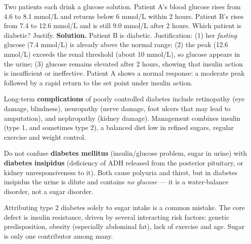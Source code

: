 \documentclass[11pt]{article}
\newcommand{\cle}[1]{{\popxbold\color{popdark}#1}}
\begin{document}
\begin{exoresolu}
Two patients each drink a glucose solution. Patient A's blood glucose rises from 4.6 to 8.1 mmol/L and returns below 6 mmol/L within 2 hours. Patient B's rises from 7.4 to 12.6 mmol/L and is still 9.0 mmol/L after 2 hours. Which patient is diabetic? Justify.
\tcblower
\textbf{Solution.} Patient B is diabetic. Justification: (1) her \emph{fasting} glucose (7.4 mmol/L) is already above the normal range; (2) the peak (12.6 mmol/L) exceeds the renal threshold (about 10 mmol/L), so glucose appears in the urine; (3) glucose remains elevated after 2 hours, showing that insulin action is insufficient or ineffective. Patient A shows a normal response: a moderate peak followed by a rapid return to the set point under insulin action.
\end{exoresolu}

Long-term \textbf{complications} of poorly controlled diabetes include \cle{retinopathy} (eye damage, blindness), \cle{neuropathy} (nerve damage, foot ulcers that may lead to amputation), and \cle{nephropathy} (kidney damage). Management combines insulin (type 1, and sometimes type 2), a balanced diet low in refined sugars, regular exercise and weight control.

\begin{attention}
Do not confuse \textbf{diabetes mellitus} (insulin/glucose problem, sugar in urine) with \textbf{diabetes insipidus} (deficiency of \cle{ADH} released from the posterior pituitary, or kidney unresponsiveness to it). Both cause polyuria and thirst, but in diabetes insipidus the urine is dilute and contains \emph{no glucose} — it is a water-balance disorder, not a sugar disorder.
\end{attention}

\begin{attention}
Attributing type 2 diabetes solely to sugar intake is a common mistake. The core defect is \cle{insulin resistance}, driven by several interacting risk factors: genetic predisposition, obesity (especially abdominal fat), lack of exercise and age. Sugar is only one contributor among many.
\end{attention}
\end{document}
